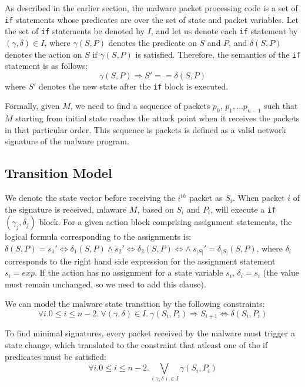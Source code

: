 \documentclass[twocolumn, 11pt]{paper}
\begin{document}
As described in the earlier section, the malware
packet processing code is a set of \texttt{if} 
statements whose predicates are over the set of state
and packet variables. Let the set of \texttt{if} 
statements be denoted by $I$, and let us denote each \texttt{if} 
statement by $(\gamma, \delta) \in I$, where $\gamma(S,P)$
denotes the predicate on $S$ and $P$, and $\delta(S,P)$ denotes
the action on $S$ if $\gamma(S,P)$ is satisfied. Therefore,
the semantics of the \texttt{if} statement is as follows:
\begin{equation}
\gamma(S,P) \Rightarrow S' == \delta(S,P)
\end{equation}
where $S'$ denotes the new state after the \texttt{if} 
block is executed. 

Formally, given $M$, we need to find a sequence of packets $p_0$,
$p_1, \ldots p_{n-1}$ such that $M$ starting from initial
state reaches the attack point when it receives the packets in
that particular order. This sequence is packets is defined as a 
valid network signature of the malware program.

\subsection{Transition Model}
We denote the state
vector before receiving the $i^{th}$ packet as $S_i$.
When packet $i$ of the signature is received, 
mlaware $M$, based on $S_i$ and $P_{i}$, will execute 
a \texttt{if} $(\gamma_j, \delta_j)$ block.
For a given action block comprising  
assignment statements, the logical formula corresponding to
the assignments is: 
$\delta(S,P) = s_1' \Leftrightarrow \delta_1(S,P) \wedge s_2' \Leftrightarrow  \delta_2(S,P) \Leftrightarrow  \wedge ~s_{|S|}' = \delta_{|S|}(S,P)$, 
where $\delta_i$ corresponds to the right hand side
expression for the assignment statement $s_i = exp$.
If the action has no assignment for a state 
variable $s_i$, $\delta_i = s_i$ (the value must 
remain unchanged, so we need to add this clause).

We can model the malware state transition 
by the following constraints: 
\begin{equation}
\forall i. 0 \leq i \leq n-2.~\forall (\gamma, \delta) \in I. ~\gamma(S_i, P_{i}) \Rightarrow S_{i+1} \Leftrightarrow \delta(S_i, P_{i})
\end{equation}

To find minimal signatures, every packet received by the malware 
must trigger a state change, which translated to the constraint
that atleast one of the if predicates must be satisfied: 
\begin{equation}
\forall i. 0 \leq i \leq n-2. \bigvee_{(\gamma, \delta) \in I} \gamma(S_i, P_{i})
\end{equation}
\end{document}
